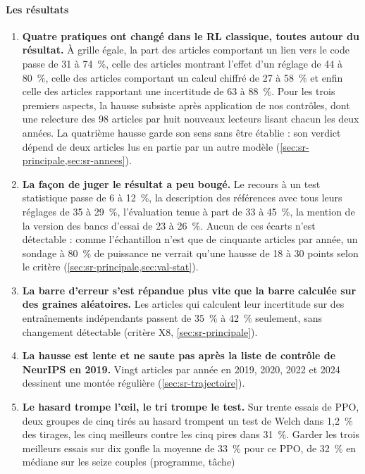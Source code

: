 \paragraph{Les résultats}
\begin{enumerate}
  \item \textbf{Quatre pratiques ont changé dans le RL classique, toutes autour du résultat.} À grille égale,
  la part des articles comportant un lien vers le code passe de 31 à 74~\%, celle des articles montrant
  l'effet d'un réglage de 44 à 80~\%, celle des articles comportant un calcul chiffré de 27 à 58~\% et
  enfin celle des articles rapportant une incertitude de 63 à 88~\%. Pour les trois premiers aspects, la
  hausse subsiste après application de nos contrôles, dont une relecture des 98 articles par huit
  nouveaux lecteurs lisant chacun les deux années. La quatrième hausse garde son sens sans être établie :
  son verdict dépend de deux articles lus en partie par un autre modèle
  (\cref{sec:sr-principale,sec:sr-annees}).
  \item \textbf{La façon de juger le résultat a peu bougé.} Le recours à un test statistique passe de 6 à
  12~\%, la description des références avec tous leurs réglages de 35 à 29~\%, l'évaluation tenue à
  part de 33 à 45~\%, la mention de la version des bancs d'essai de 23 à 26~\%. Aucun de ces écarts
  n'est détectable : comme l'échantillon n'est que de cinquante articles par année, un sondage à 80~\%
  de puissance ne verrait qu'une hausse de 18 à 30 points selon le critère
  (\cref{sec:sr-principale,sec:val-stat}).
  \item \textbf{La barre d'erreur s'est répandue plus vite que la barre calculée sur des graines
  aléatoires.} Les articles qui calculent leur incertitude sur des entraînements indépendants passent
  de 35~\% à 42~\% seulement, sans changement détectable (critère X8, \cref{sec:sr-principale}).
  \item \textbf{La hausse est lente et ne saute pas après la liste de contrôle de NeurIPS en 2019.}
  Vingt articles par année en 2019, 2020, 2022 et 2024 dessinent une montée régulière
  (\cref{sec:sr-trajectoire}).
  \item \textbf{Le hasard trompe l'œil, le tri trompe le test.} Sur trente essais de PPO, deux groupes
  de cinq tirés au hasard trompent un test de Welch dans 1,2~\% des tirages, les cinq meilleurs
  contre les cinq pires dans 31~\%. Garder les trois meilleurs essais sur dix gonfle la moyenne de
  33~\% pour ce PPO, de 32~\% en médiane sur les seize couples (programme, tâche)

\end{enumerate}
